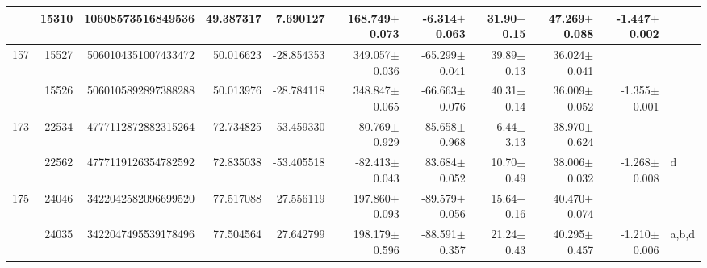\documentclass{ws-ijmpd}
\begin{document}
\begin{landscape}
\begin{longtable}{rrrrrrrrrrl}
            &   15310 &        10608573516849536 &                    49.387317 &                     7.690127 &                168.749$\pm$0.073 &                 -6.314$\pm$0.063 &          31.90$\pm$  0.15 &        47.269$\pm$0.088 &                          -1.447$\pm$0.002 &                                                    \\
 \hline 157 &   15527 &      5060104351007433472 &                    50.016623 &                   -28.854353 &                349.057$\pm$0.036 &                -65.299$\pm$0.041 &          39.89$\pm$  0.13 &        36.024$\pm$0.041 &                                           &                                                    \\
            &   15526 &      5060105892897388288 &                    50.013976 &                   -28.784118 &                348.847$\pm$0.065 &                -66.663$\pm$0.076 &          40.31$\pm$  0.14 &        36.009$\pm$0.052 &                          -1.355$\pm$0.001 &                                                    \\
 \hline 173 &   22534 &      4777112872882315264 &                    72.734825 &                   -53.459330 &                -80.769$\pm$0.929 &                 85.658$\pm$0.968 &           6.44$\pm$  3.13 &        38.970$\pm$0.624 &                                           &                                                    \\
            &   22562 &      4777119126354782592 &                    72.835038 &                   -53.405518 &                -82.413$\pm$0.043 &                 83.684$\pm$0.052 &          10.70$\pm$  0.49 &        38.006$\pm$0.032 &                          -1.268$\pm$0.008 &                                                  d \\
 \hline 175 &   24046 &      3422042582096699520 &                    77.517088 &                    27.556119 &                197.860$\pm$0.093 &                -89.579$\pm$0.056 &          15.64$\pm$  0.16 &        40.470$\pm$0.074 &                                           &                                                    \\
            &   24035 &      3422047495539178496 &                    77.504564 &                    27.642799 &                198.179$\pm$0.596 &                -88.591$\pm$0.357 &          21.24$\pm$  0.43 &        40.295$\pm$0.457 &                          -1.210$\pm$0.006 &                                              a,b,d \\

\end{longtable}
\end{landscape}
\end{document}
